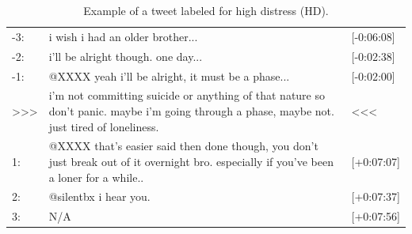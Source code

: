 \documentclass[11pt]{article}
\begin{document}
\begin{table}[h]
\footnotesize
\begin{tabular}{|p{0.8cm}|p{4.25cm}|p{1.2cm}|}
\hline
-3:                                  & i wish i had an older brother...                                                                                                             & {[}-0:06:08{]}              \\
-2:                                  & i'll be alright though. one day...                                                                                                           & {[}-0:02:38{]}              \\
-1:                                  & @XXXX yeah i'll be alright, it must be a phase...                                                                                          & {[}-0:02:00{]}              \\
\textgreater\textgreater\textgreater & i'm not committing suicide or anything of that nature so don't panic. maybe i'm going through a phase, maybe not. just tired of loneliness.  & \textless\textless\textless \\
1:                                   & @XXXX that's easier said then done though, you don't just break out of it overnight bro. especially if you've been a loner for a while.. & {[}+0:07:07{]}              \\
2:                                   & @silentbx i hear you.                                                                                                                        & {[}+0:07:37{]}              \\
3:                                   &   N/A                                                                                                                                           & {[}+0:07:56{]}              \\ \hline
\end{tabular}
\caption{Example of a tweet labeled for high distress (HD).}
\label{fig-hdeg1}
\end{table}
\end{document}
